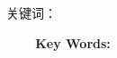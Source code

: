 \documentclass[a4paper,12pt,openany,twoside]{book}
\begin{document}
\begin{sloppypar}
\begin{CJK*}{UTF8}{song}

		\begin{center}%
			{
				\vspace*{11pt}
				\hei{}}
			\vspace{7pt}

		\end{center}
		\thispagestyle{cchair}
		\pagestyle{cchair}

		\song\xiaosi\setlength{\baselineskip}{20pt}
		\setlength\parindent{2em}\@cabstract
		\vspace{\baselineskip}


		{{\hei\xiaosi 关键词：} \@ckeywords}


		\clearpage
		\begin{center}%
			{
				\vspace*{-4pt}
				\sanhao\bf {}}
			\vspace*{1.45pt}

		\end{center}
		\thispagestyle{echair}
		\pagestyle{echair}
		\newcommand{\enabstractname}{Abstract}
		\setlength{\baselineskip}{20pt}\setlength\parindent{1em}\@eabstract
		\vspace{\baselineskip}
		\noindent
		{{\xiaosi\textbf{~~~~Key Words:}} \@ekeywords}



		\clearpage
		\newcommand{\loflabel}{图~}
		\renewcommand{\numberline}[1]{\song\xiaosi\loflabel~#1\hspace*{\baselineskip}}


\end{CJK*}
\end{sloppypar}
\end{document}
